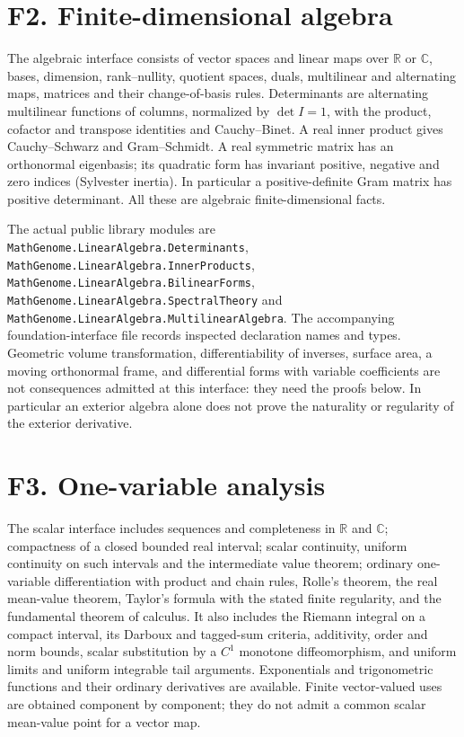 \documentclass[11pt,oneside,openany]{book}
\theoremstyle{definition}
\theoremstyle{remark}
\newcounter{foundation}
\newcommand{\R}{\mathbb R}
\newcommand{\C}{\mathbb C}
\begin{document}
\section*{F2. Finite-dimensional algebra}\label{base:linear}
The algebraic interface consists of vector spaces and linear maps over $\R$ or
$\C$, bases, dimension, rank--nullity, quotient spaces, duals, multilinear and
alternating maps, matrices and their change-of-basis rules. Determinants are
alternating multilinear functions of columns, normalized by $\det I=1$, with
the product, cofactor and transpose identities and Cauchy--Binet. A real inner
product gives Cauchy--Schwarz and Gram--Schmidt. A real symmetric matrix has an
orthonormal eigenbasis; its quadratic form has invariant positive, negative and
zero indices (Sylvester inertia). In particular a positive-definite Gram matrix
has positive determinant. All these are algebraic finite-dimensional facts.

The actual public library modules are
\nolinkurl{MathGenome.LinearAlgebra.Determinants},
\nolinkurl{MathGenome.LinearAlgebra.InnerProducts},
\nolinkurl{MathGenome.LinearAlgebra.BilinearForms},
\nolinkurl{MathGenome.LinearAlgebra.SpectralTheory} and
\nolinkurl{MathGenome.LinearAlgebra.MultilinearAlgebra}.
The accompanying foundation-interface file records inspected declaration names
and types. Geometric volume transformation, differentiability of inverses,
surface area, a moving orthonormal frame, and differential forms with variable
coefficients are not consequences admitted at this interface: they need the
proofs below. In particular an exterior algebra alone does not prove the
naturality or regularity of the exterior derivative.

\section*{F3. One-variable analysis}\label{base:scalar}
The scalar interface includes sequences and completeness in $\R$ and $\C$;
compactness of a closed bounded real interval; scalar continuity, uniform
continuity on such intervals and the intermediate value theorem; ordinary
one-variable differentiation with product and chain rules, Rolle's theorem,
the real mean-value theorem, Taylor's formula with the stated finite
regularity, and the fundamental theorem of calculus. It also includes the
Riemann integral on a compact interval, its Darboux and tagged-sum criteria,
additivity, order and norm bounds, scalar substitution by a $C^1$ monotone
diffeomorphism, and uniform limits and uniform integrable tail arguments.
Exponentials and trigonometric functions and their ordinary derivatives are
available. Finite vector-valued uses are obtained component by component;
they do not admit a common scalar mean-value point for a vector map.
\end{document}
